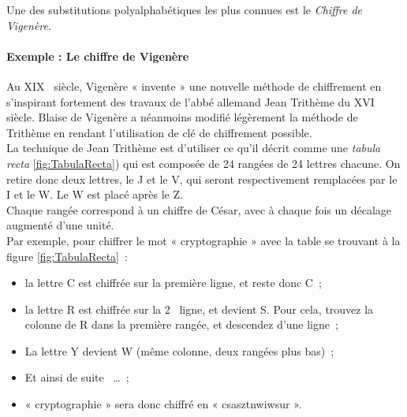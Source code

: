 Une des substitutions polyalphabétiques les plus connues est le
\emph{Chiffre de Vigenère}.

\paragraph{Exemple : Le chiffre de Vigenère\label{syst:ChiffreVigenere}}
Au XIX\ieme~ siècle, Vigenère « invente » une nouvelle méthode de
chiffrement en s'inspirant fortement des travaux de l'abbé allemand
Jean Trithème du XVI\ieme~ siècle. Blaise de Vigenère a néanmoins
modifié légèrement la méthode de Trithème en rendant l'utilisation de
clé de chiffrement possible.\\

La technique de Jean Trithème est d'utiliser ce qu'il décrit comme une
\emph{tabula recta}
\ref{fig:TabulaRecta}) qui est composée de 24 rangées de 24
lettres chacune. On retire donc deux lettres, le J et le V, qui seront
respectivement remplacées par le I et le W. Le W est placé après le
Z.\\
Chaque rangée correspond à un chiffre de César,
avec à chaque fois un décalage augmenté d'une unité. \\

Par exemple, pour chiffrer le mot « cryptographie » avec la table se
trouvant à la figure \ref{fig:TabulaRecta}~: 
\begin{itemize}
  \item la lettre C est chiffrée sur la première ligne, et reste
    donc C~;
  \item la lettre R est chiffrée sur la 2\ieme~ ligne, et devient
    S. Pour cela, trouvez la colonne de R dans la première rangée, et
    descendez d'une ligne~;
  \item La lettre Y devient W (même colonne, deux rangées plus bas)~;
  \item Et ainsi de suite ~\dots~;
  \item « cryptographie » sera donc chiffré en « csasztnwiwsur ».
\end{itemize}

